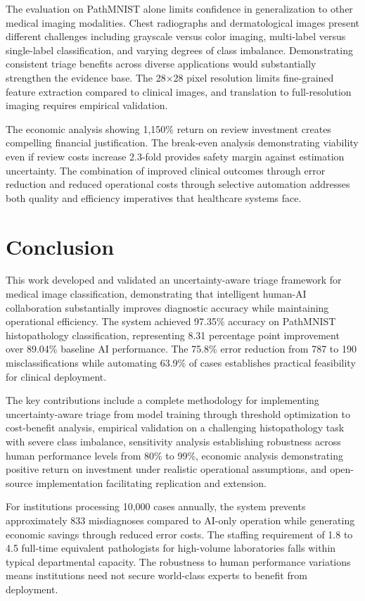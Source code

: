 \documentclass[10pt,a4paper]{article}
\begin{document}
The evaluation on PathMNIST alone limits confidence in generalization to other medical imaging modalities. Chest radiographs and dermatological images present different challenges including grayscale versus color imaging, multi-label versus single-label classification, and varying degrees of class imbalance. Demonstrating consistent triage benefits across diverse applications would substantially strengthen the evidence base. The 28×28 pixel resolution limits fine-grained feature extraction compared to clinical images, and translation to full-resolution imaging requires empirical validation.

The economic analysis showing 1,150\% return on review investment creates compelling financial justification. The break-even analysis demonstrating viability even if review costs increase 2.3-fold provides safety margin against estimation uncertainty. The combination of improved clinical outcomes through error reduction and reduced operational costs through selective automation addresses both quality and efficiency imperatives that healthcare systems face.

\section{Conclusion}

This work developed and validated an uncertainty-aware triage framework for medical image classification, demonstrating that intelligent human-AI collaboration substantially improves diagnostic accuracy while maintaining operational efficiency. The system achieved 97.35\% accuracy on PathMNIST histopathology classification, representing 8.31 percentage point improvement over 89.04\% baseline AI performance. The 75.8\% error reduction from 787 to 190 misclassifications while automating 63.9\% of cases establishes practical feasibility for clinical deployment.

The key contributions include a complete methodology for implementing uncertainty-aware triage from model training through threshold optimization to cost-benefit analysis, empirical validation on a challenging histopathology task with severe class imbalance, sensitivity analysis establishing robustness across human performance levels from 80\% to 99\%, economic analysis demonstrating positive return on investment under realistic operational assumptions, and open-source implementation facilitating replication and extension.

For institutions processing 10,000 cases annually, the system prevents approximately 833 misdiagnoses compared to AI-only operation while generating economic savings through reduced error costs. The staffing requirement of 1.8 to 4.5 full-time equivalent pathologists for high-volume laboratories falls within typical departmental capacity. The robustness to human performance variations means institutions need not secure world-class experts to benefit from deployment.
\end{document}
